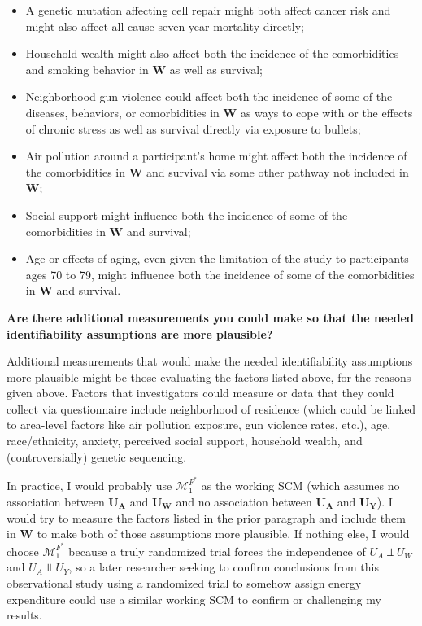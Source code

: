 \documentclass{article}\usepackage[]{graphicx}\usepackage[]{xcolor}
\begin{document}
\begin{enumerate}[label=\textbf{\arabic*.}]
\begin{enumerate}[label=\textbf{(\alph*)}]
\begin{itemize}
  \item A genetic mutation affecting cell repair might both affect cancer risk and might also affect all-cause seven-year mortality directly;
  \item Household wealth might also affect both the incidence of the comorbidities and smoking behavior in $\bm{W}$ as well as survival; 
  \item Neighborhood gun violence could affect both the incidence of some of the diseases, behaviors, or comorbidities in $\bm{W}$ as ways to cope with or the effects of chronic stress as well as survival directly via exposure to bullets;
  \item Air pollution around a participant's home might affect both the incidence of the comorbidities in $\bm{W}$ and survival via some other pathway not included in $\bm{W}$;
  \item Social support might influence both the incidence of some of the comorbidities in $\bm{W}$ and survival;
  \item Age or effects of aging, even given the limitation of the study to participants ages 70 to 79, might influence both the incidence of some of the comorbidities in $\bm{W}$ and survival.
\end{itemize}

\textbf{Are there additional measurements you could make so that the needed identifiability assumptions are more plausible?}

Additional measurements that would make the needed identifiability assumptions more plausible might be those evaluating the factors listed above, for the reasons given above. Factors that investigators could measure or data that they could collect via questionnaire include neighborhood of residence (which could be linked to area-level factors like air pollution exposure, gun violence rates, etc.), age, race/ethnicity, anxiety, perceived social support, household wealth, and (controversially) genetic sequencing.

In practice, I would probably use $\mathcal{M}^{F^*}_1$ as the working SCM (which assumes no association between $\bm{U_A}$ and $\bm{U_W}$ and no association between $\bm{U_A}$ and $\bm{U_Y}$). I would try to measure the factors listed in the prior paragraph and include them in $\bm{W}$ to make both of those assumptions more plausible. If nothing else, I would choose $\mathcal{M}^{F^*}_1$ because a truly randomized trial forces the independence of $U_A \Perp U_W$ and $U_A \Perp U_Y$, so a later researcher seeking to confirm conclusions from this observational study using a randomized trial to somehow assign energy expenditure could use a similar working SCM to confirm or challenging my results.


\end{enumerate}
\end{enumerate}
\end{document}
